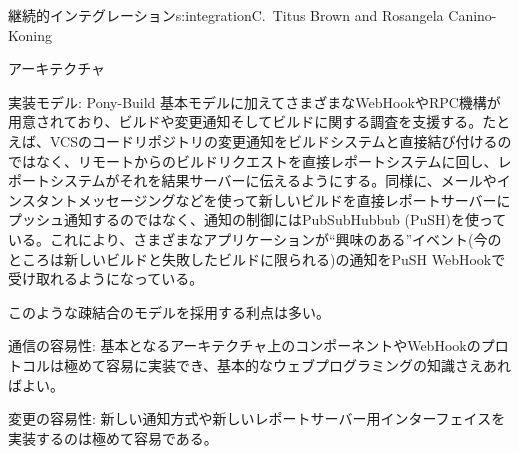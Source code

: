 \begin{aosachapter}{継続的インテグレーション}{s:integration}{C.\ Titus Brown and Rosangela Canino-Koning}
\begin{aosasect1}{アーキテクチャ}
\begin{aosasect2}{実装モデル: Pony-Build}
基本モデルに加えてさまざまなWebHookやRPC機構が用意されており、ビルドや変更通知そしてビルドに関する調査を支援する。たとえば、VCSのコードリポジトリの変更通知をビルドシステムと直接結び付けるのではなく、リモートからのビルドリクエストを直接レポートシステムに回し、レポートシステムがそれを結果サーバーに伝えるようにする。同様に、メールやインスタントメッセージングなどを使って新しいビルドを直接レポートサーバーにプッシュ通知するのではなく、通知の制御にはPubSubHubbub (PuSH)を使っている。これにより、さまざまなアプリケーションが``興味のある''イベント(今のところは新しいビルドと失敗したビルドに限られる)の通知をPuSH WebHookで受け取れるようになっている。

このような疎結合のモデルを採用する利点は多い。

\begin{aosadescription}

  \item{通信の容易性:} 基本となるアーキテクチャ上のコンポーネントやWebHookのプロトコルは極めて容易に実装でき、基本的なウェブプログラミングの知識さえあればよい。

  \item{変更の容易性:} 新しい通知方式や新しいレポートサーバー用インターフェイスを実装するのは極めて容易である。


\end{aosadescription}
\end{aosasect2}
\end{aosasect1}
\end{aosachapter}
